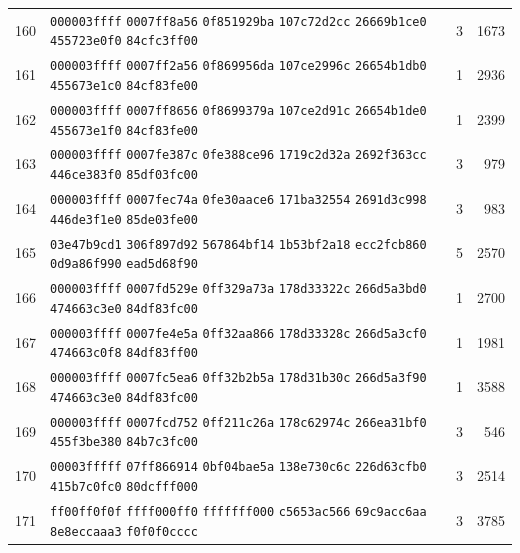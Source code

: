 \begin{longtable}{@{}r p{12cm} r r@{}}
160 & \texttt{000003ffff} \texttt{0007ff8a56} \texttt{0f851929ba} \texttt{107c72d2cc} \texttt{26669b1ce0} \texttt{455723e0f0} \texttt{84cfc3ff00} & 3 & 1673 \\
161 & \texttt{000003ffff} \texttt{0007ff2a56} \texttt{0f869956da} \texttt{107ce2996c} \texttt{26654b1db0} \texttt{455673e1c0} \texttt{84cf83fe00} & 1 & 2936 \\
162 & \texttt{000003ffff} \texttt{0007ff8656} \texttt{0f8699379a} \texttt{107ce2d91c} \texttt{26654b1de0} \texttt{455673e1f0} \texttt{84cf83fe00} & 1 & 2399 \\
163 & \texttt{000003ffff} \texttt{0007fe387c} \texttt{0fe388ce96} \texttt{1719c2d32a} \texttt{2692f363cc} \texttt{446ce383f0} \texttt{85df03fc00} & 3 & 979 \\
164 & \texttt{000003ffff} \texttt{0007fec74a} \texttt{0fe30aace6} \texttt{171ba32554} \texttt{2691d3c998} \texttt{446de3f1e0} \texttt{85de03fe00} & 3 & 983 \\
165 & \texttt{03e47b9cd1} \texttt{306f897d92} \texttt{567864bf14} \texttt{1b53bf2a18} \texttt{ecc2fcb860} \texttt{0d9a86f990} \texttt{ead5d68f90} & 5 & 2570 \\
166 & \texttt{000003ffff} \texttt{0007fd529e} \texttt{0ff329a73a} \texttt{178d33322c} \texttt{266d5a3bd0} \texttt{474663c3e0} \texttt{84df83fc00} & 1 & 2700 \\
167 & \texttt{000003ffff} \texttt{0007fe4e5a} \texttt{0ff32aa866} \texttt{178d33328c} \texttt{266d5a3cf0} \texttt{474663c0f8} \texttt{84df83ff00} & 1 & 1981 \\
168 & \texttt{000003ffff} \texttt{0007fc5ea6} \texttt{0ff32b2b5a} \texttt{178d31b30c} \texttt{266d5a3f90} \texttt{474663c3e0} \texttt{84df83fc00} & 1 & 3588 \\
169 & \texttt{000003ffff} \texttt{0007fcd752} \texttt{0ff211c26a} \texttt{178c62974c} \texttt{266ea31bf0} \texttt{455f3be380} \texttt{84b7c3fc00} & 3 & 546 \\
170 & \texttt{00003fffff} \texttt{07ff866914} \texttt{0bf04bae5a} \texttt{138e730c6c} \texttt{226d63cfb0} \texttt{415b7c0fc0} \texttt{80dcfff000} & 3 & 2514 \\
171 & \texttt{ff00ff0f0f} \texttt{ffff000ff0} \texttt{fffffff000} \texttt{c5653ac566} \texttt{69c9acc6aa} \texttt{8e8eccaaa3} \texttt{f0f0f0cccc} & 3 & 3785 \\
\end{longtable}
\endgroup
